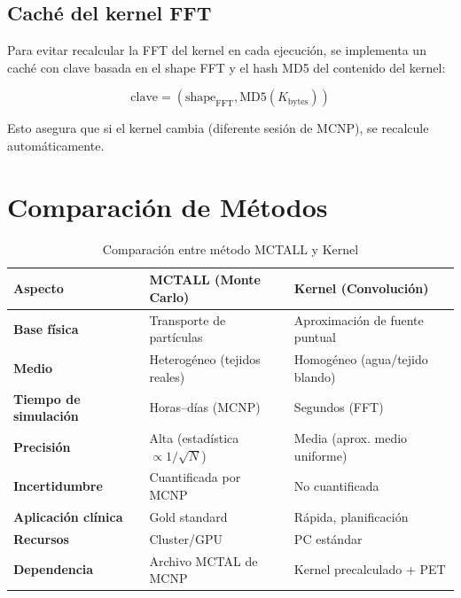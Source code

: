 \documentclass[12pt,a4paper]{article}
\begin{document}
\subsection{Caché del kernel FFT}

Para evitar recalcular la FFT del kernel en cada ejecución, se implementa
un caché con clave basada en el shape FFT y el hash MD5 del contenido del
kernel:

\begin{equation}
    \text{clave} = (\text{shape}_{\text{FFT}}, \text{MD5}(K_{\text{bytes}}))
\end{equation}

Esto asegura que si el kernel cambia (diferente sesión de MCNP), se
recalcule automáticamente.

\section{Comparación de Métodos}

\begin{table}[H]
\centering
\caption{Comparación entre método MCTALL y Kernel}
\label{tab:comparacion}
\begin{tabular}{p{4cm} p{5cm} p{5cm}}
\toprule
\textbf{Aspecto} & \textbf{MCTALL (Monte Carlo)} & \textbf{Kernel (Convolución)} \\
\midrule
\textbf{Base física} & Transporte de partículas & Aproximación de fuente puntual \\
\textbf{Medio} & Heterogéneo (tejidos reales) & Homogéneo (agua/tejido blando) \\
\textbf{Tiempo de simulación} & Horas--días (MCNP) & Segundos (FFT) \\
\textbf{Precisión} & Alta (estadística $\propto 1/\sqrt{N}$) & Media (aprox. medio uniforme) \\
\textbf{Incertidumbre} & Cuantificada por MCNP & No cuantificada \\
\textbf{Aplicación clínica} & Gold standard & Rápida, planificación \\
\textbf{Recursos} & Cluster/GPU & PC estándar \\
\textbf{Dependencia} & Archivo MCTAL de MCNP & Kernel precalculado + PET \\
\bottomrule
\end{tabular}
\end{table}
\end{document}
